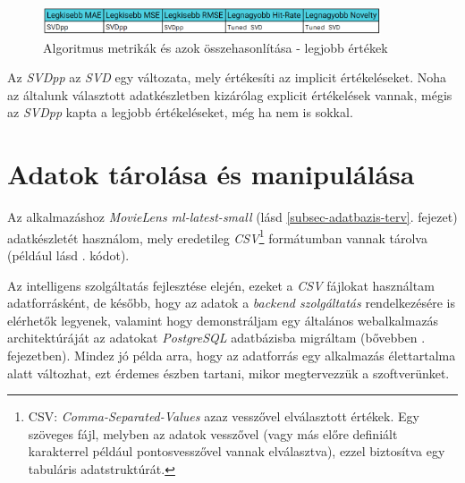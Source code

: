 \documentclass[
]{thesis-ekf}
\theoremstyle{definition}
\theoremstyle{remark}
\begin{document}
\begin{figure}[H]
	\centering
	\includegraphics[width=10cm]{images/algoritmus-metrikak-legjobb-ertekek.png}
	\caption[Algoritmus metrikák és azok összehasonlítása - legjobb értékek]{Algoritmus metrikák és azok összehasonlítása - legjobb értékek}
	\label{fig-algoruitmus-metrikak-legjobb-ertekek}
\end{figure}

Az \emph{SVDpp} az \emph{SVD} egy változata, mely értékesíti az implicit értékeléseket. Noha az általunk választott adatkészletben kizárólag explicit értékelések vannak, mégis az \emph{SVDpp} kapta a legjobb értékeléseket, még ha nem is sokkal.

\section{Adatok tárolása és manipulálása}
\label{sec-adatok-tarolasa-es-manipulalasa}
Az alkalmazáshoz \emph{MovieLens ml-latest-small} (lásd \ref{subsec-adatbazis-terv}. fejezet) adatkészletét használom, mely eredetileg \emph{CSV}\footnote{CSV: \emph{Comma-Separated-Values} azaz vesszővel elválasztott értékek. Egy szöveges fájl, melyben az adatok vesszővel (vagy más előre definiált karakterrel például pontosvesszővel vannak elválasztva), ezzel biztosítva egy tabuláris adatstruktúrát.} formátumban vannak tárolva (például lásd . kódot).



Az intelligens szolgáltatás fejlesztése elején, ezeket a \emph{CSV} fájlokat használtam adatforrásként, de később, hogy az adatok a \emph{backend szolgáltatás} rendelkezésére is elérhetők legyenek, valamint hogy demonstráljam egy általános webalkalmazás architektúráját az adatokat \emph{PostgreSQL} adatbázisba migráltam (bővebben . fejezetben). Mindez jó példa arra, hogy az adatforrás egy alkalmazás élettartalma alatt változhat, ezt érdemes észben tartani, mikor megtervezzük a szoftverünket.
\end{document}
